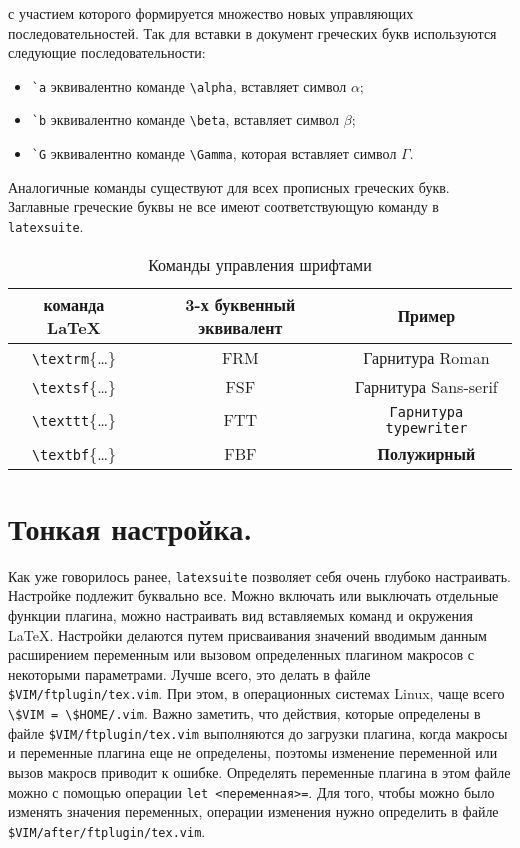 \documentclass[a4paper]{article}
\begin{document}
\begin{itemize}
		с участием которого формируется 
		множество новых управляющих последовательностей. Так для вставки в документ
		греческих букв используются следующие последовательности:
		\begin{itemize}
			\item \verb|`a| эквивалентно команде \verb|\alpha|, вставляет символ $\alpha$;
			\item \verb|`b| эквивалентно команде \verb|\beta|, вставляет символ $\beta$;
			\item \verb|`G| эквивалентно команде \verb|\Gamma|, которая вставляет символ $\Gamma$.
		\end{itemize}
		Аналогичные команды существуют для всех прописных греческих букв. Заглавные греческие
		буквы не все имеют соответствующую команду в \texttt{latexsuite}.
\end{itemize}
			\begin{table}
				\centering
				\begin{tabular}{|c|c|c|}
					\hline
					команда \LaTeX&3-х буквенный эквивалент&Пример\\
					\hline
					\verb|\textrm|\{\ldots\}&FRM&\textrm{Гарнитура Roman}\\
					\verb|\textsf|\{\ldots\}&FSF&\textsf{Гарнитура Sans-serif}\\
					\verb|\texttt|\{\ldots\}&FTT&\texttt{Гарнитура typewriter}\\
					\verb|\textbf|\{\ldots\}&FBF&\textbf{Полужирный}\\
					\hline
				\end{tabular}
				\caption{Команды управления шрифтами}
				\label{tab:fonts}
			\end{table}
\part{Тонкая настройка.}
Как уже говорилось ранее, \texttt{latexsuite} позволяет себя очень глубоко настраивать.
Настройке подлежит буквально все. Можно включать или выключать отдельные функции плагина,
можно настраивать вид вставляемых команд и окружения \LaTeX. Настройки делаются путем
присваивания значений вводимым данным расширением переменным или вызовом определенных
плагином макросов с некоторыми параметрами. Лучше всего, это делать в файле \verb|$VIM/ftplugin/tex.vim|. 
При этом, в операционных системах Linux, 
чаще всего \verb|\$VIM = \$HOME/.vim|. Важно заметить, что действия, которые определены в
файле \verb|$VIM/ftplugin/tex.vim| выполняются до загрузки плагина, когда макросы и переменные
плагина еще не определены, поэтомы изменение переменной или вызов макросв приводит к ошибке. 
Определять переменные плагина в этом файле можно с помощью операции \verb|let <переменная>=|. 
Для того, чтобы можно было изменять значения переменных, операции изменения нужно определить в файле
\verb|$VIM/after/ftplugin/tex.vim|.
\sloppy
\end{document}
